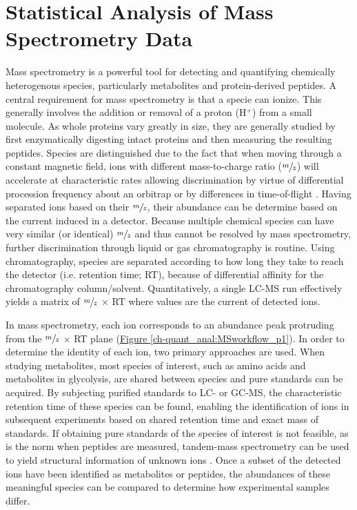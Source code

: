 
\chapter{Statistical Analysis of Mass Spectrometry Data\label{ch:quant_anal}}

Mass spectrometry is a powerful tool for detecting and quantifying chemically heterogenous species, particularly metabolites and protein-derived peptides. A central requirement for mass spectrometry is that a specie can ionize. This generally involves the addition or removal of a proton (H$^{+}$) from a small molecule. As whole proteins vary greatly in size, they are generally studied by first enzymatically digesting intact proteins and then measuring the resulting peptides. Species are distinguished due to the fact that when moving through a constant magnetic field, ions with different mass-to-charge ratio ($\sfrac{m}{z}$) will accelerate at characteristic rates allowing discrimination by virtue of differential procession frequency about an orbitrap or by differences in time-of-flight \cite{Boyd:2011vt}. Having separated ions based on their $\sfrac{m}{z}$, their abundance can be determine based on the current induced in a detector.  Because multiple chemical species can have very similar (or identical) $\sfrac{m}{z}$ and thus cannot be resolved by mass spectrometry, further discrimination through liquid or gas chromatography is routine.  Using chromatography, species are separated according to how long they take to reach the detector (i.e. retention time; RT), because of differential affinity for the chromatography column/solvent. Quantitatively, a single LC-MS run effectively yields a matrix of $\sfrac{m}{z}$ $\times$ RT where values are the current of detected ions.  

In mass spectrometry, each ion corresponds to an abundance peak protruding from the $\sfrac{m}{z}$ $\times$ RT plane (\hyperref[ch-quant_anal:MSworkflow_p1]{Figure \ref{ch-quant_anal:MSworkflow_p1}}). In order to determine the identity of each ion, two primary approaches are used.  When studying metabolites, most species of interest, such as amino acids and metabolites in glycolysis, are shared between species and pure standards can be acquired.  By subjecting purified standards to LC- or GC-MS, the characteristic retention time of these species can be found, enabling the identification of ions in subsequent experiments based on shared retention time and exact mass of standards.  If obtaining pure standards of the species of interest is not feasible, as is the norm when peptides are measured, tandem-mass spectrometry can be used to yield structural information of unknown ions \cite{Nesvizhskii:2005jp, Huang:2012tl}.  Once a subset of the detected ions have been identified as metabolites or peptides, the abundances of these meaningful species can be compared to determine how experimental samples differ.

